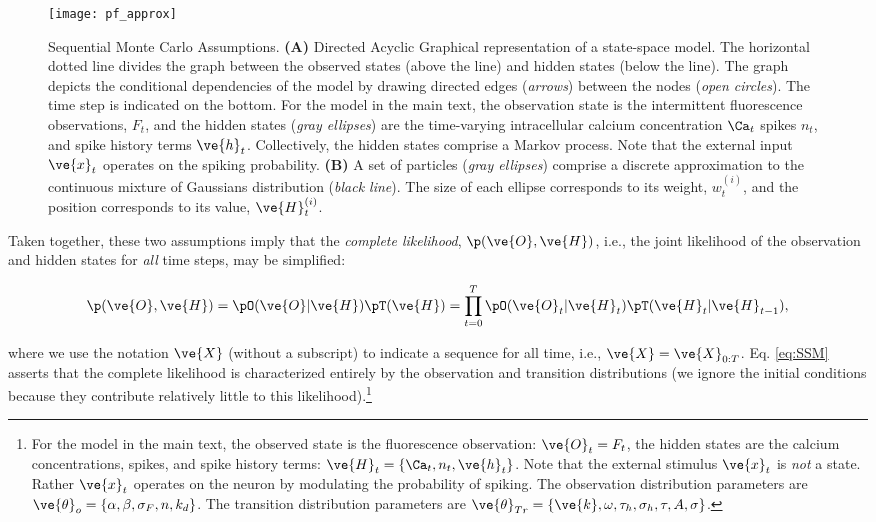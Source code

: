 \documentclass{article}
\begin{document}
\begin{figure}[h]
\centering
\texttt{[image: pf\_approx]}
\caption{Sequential Monte Carlo Assumptions.  \textbf{(A)} Directed Acyclic Graphical representation of a state-space model. The horizontal dotted line divides the graph between the observed states (above the line) and hidden states (below the line). The graph depicts the conditional dependencies of the model by drawing directed edges (\emph{arrows}) between the nodes (\emph{open circles}). The time step is indicated on the bottom.  For the model in the main text, the observation state is the intermittent fluorescence observations, $F_t$, and the hidden states (\emph{gray ellipses}) are the time-varying intracellular calcium concentration $\Ca_t$ spikes $n_t$, and spike history terms $\ve{h}_t$. Collectively, the hidden states comprise a Markov process. Note that the external input $\ve{x}_t$ operates on the spiking probability. \textbf{(B)} A set of particles (\emph{gray ellipses}) comprise a discrete approximation to the continuous mixture of Gaussians distribution (\emph{black line}). The size of each ellipse corresponds to its weight, $w_t^{(i)}$, and the position corresponds to its value, $\ve{H}_t^{(i)}$.} \label{fig}
\end{figure}

Taken together, these two assumptions imply that the \emph{complete likelihood}, $\p(\ve{O}, \ve{H})$, i.e., the joint likelihood of the observation and hidden states for \emph{all} time steps, may be simplified:

\begin{align} \label{eq:SSM}
\p(\ve{O}, \ve{H}) = \pO (\ve{O} | \ve{H}) \pT (\ve{H}) = \prod_{t=0}^T \pO(\ve{O}_t | \ve{H}_t) \pT(\ve{H}_t | \ve{H}_{t-1}),
\end{align}

\noindent where we use the notation $\ve{X}$ (without a subscript) to indicate a sequence for all time, i.e., $\ve{X}=\ve{X}_{0:T}$.  Eq. \ref{eq:SSM} asserts that the complete likelihood is characterized entirely by the observation and transition distributions (we ignore the initial conditions because they contribute relatively little to this likelihood).\footnote{For the model in the main text, the observed state is the fluorescence observation: $\ve{O}_t=F_t$, the hidden states are the calcium concentrations, spikes, and spike history terms: $\ve{H}_t =\{\Ca_t, n_t,\ve{h}_t\}$. Note that the external stimulus $\ve{x}_t$ is \emph{not} a state.  Rather $\ve{x}_t$ operates on the neuron by modulating the probability of spiking. The observation distribution parameters are $\ve{\theta}_{o}=\{\alpha,\beta,\sigma_F,n,k_d\}$. The transition distribution parameters are $\ve{\theta}_{Tr}=\{ \ve{k},\omega,\tau_h,\sigma_h,\tau,A,\sigma\}$.}
\end{document}

